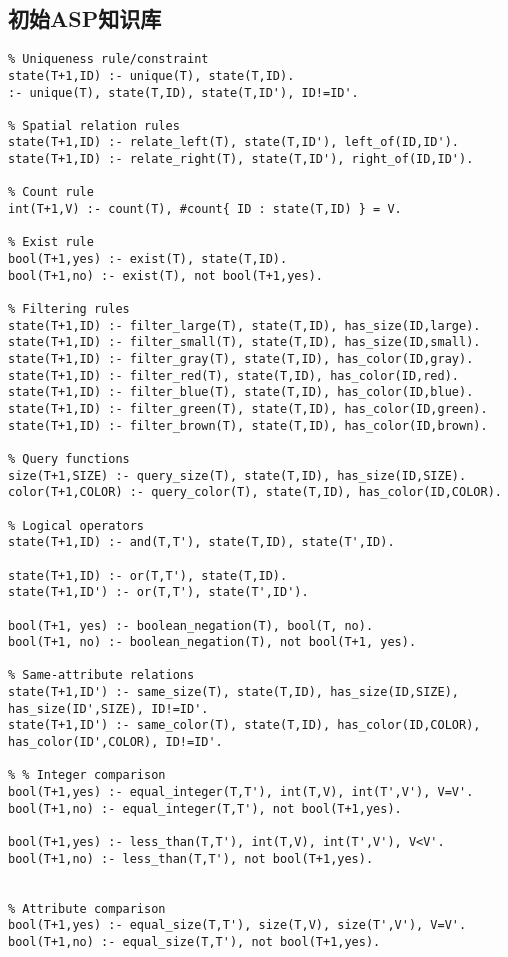 \subsection{初始ASP知识库}
\begin{lstlisting}
% Uniqueness rule/constraint
state(T+1,ID) :- unique(T), state(T,ID).
:- unique(T), state(T,ID), state(T,ID'), ID!=ID'.

% Spatial relation rules
state(T+1,ID) :- relate_left(T), state(T,ID'), left_of(ID,ID').
state(T+1,ID) :- relate_right(T), state(T,ID'), right_of(ID,ID').

% Count rule
int(T+1,V) :- count(T), #count{ ID : state(T,ID) } = V.

% Exist rule
bool(T+1,yes) :- exist(T), state(T,ID).
bool(T+1,no) :- exist(T), not bool(T+1,yes).

% Filtering rules
state(T+1,ID) :- filter_large(T), state(T,ID), has_size(ID,large).
state(T+1,ID) :- filter_small(T), state(T,ID), has_size(ID,small).
state(T+1,ID) :- filter_gray(T), state(T,ID), has_color(ID,gray).
state(T+1,ID) :- filter_red(T), state(T,ID), has_color(ID,red).
state(T+1,ID) :- filter_blue(T), state(T,ID), has_color(ID,blue).
state(T+1,ID) :- filter_green(T), state(T,ID), has_color(ID,green).
state(T+1,ID) :- filter_brown(T), state(T,ID), has_color(ID,brown).

% Query functions
size(T+1,SIZE) :- query_size(T), state(T,ID), has_size(ID,SIZE).
color(T+1,COLOR) :- query_color(T), state(T,ID), has_color(ID,COLOR).

% Logical operators
state(T+1,ID) :- and(T,T'), state(T,ID), state(T',ID).

state(T+1,ID) :- or(T,T'), state(T,ID).
state(T+1,ID') :- or(T,T'), state(T',ID').

bool(T+1, yes) :- boolean_negation(T), bool(T, no).
bool(T+1, no) :- boolean_negation(T), not bool(T+1, yes).

% Same-attribute relations
state(T+1,ID') :- same_size(T), state(T,ID), has_size(ID,SIZE), has_size(ID',SIZE), ID!=ID'.
state(T+1,ID') :- same_color(T), state(T,ID), has_color(ID,COLOR), has_color(ID',COLOR), ID!=ID'.

% % Integer comparison
bool(T+1,yes) :- equal_integer(T,T'), int(T,V), int(T',V'), V=V'.
bool(T+1,no) :- equal_integer(T,T'), not bool(T+1,yes).

bool(T+1,yes) :- less_than(T,T'), int(T,V), int(T',V'), V<V'.
bool(T+1,no) :- less_than(T,T'), not bool(T+1,yes).


% Attribute comparison
bool(T+1,yes) :- equal_size(T,T'), size(T,V), size(T',V'), V=V'.
bool(T+1,no) :- equal_size(T,T'), not bool(T+1,yes).


\end{lstlisting}
